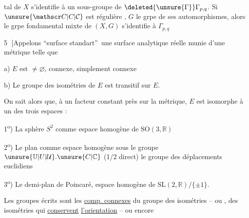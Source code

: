 %
tal de $X$ s'identifie à un sous-groupe de $\deleted{\unsure{\Gamma}}\Gamma_{p,q}$. Si $\unsure{\mathscr C|C|\mathcal C}$ est régulière , $G$ le grpe de ses automorphismes, alors le grpe fondamental mixte de $(X,G)$ s'identifie à $\Gamma_{p,q}$

\textcircled{5} [Appelons  \textquotedblleft surface  standart\textquotedblright\ une surface   analytique réelle munie d'une métrique  telle que

a) $E$ est $\ne\varnothing$, connexe, simplement connexe

b) Le groupe des isométries de $E$ est transitif sur $E$.

 On sait alors que, à un facteur constant près sur la métrique, $E$ est isomorphe à un des trois espaces :

1\textsuperscript{o}) La sphère $S^2$ comme espace homogène de $\mathrm{SO}(3,\mathbb R)$

2\textsuperscript{o}) Le plan    comme espace homogène sous le groupe $\unsure{\mathbb U|U|\mathcal U}.\unsure{C|\mathbb C}$ (1/2 direct) le groupe des déplacements euclidiens

3\textsuperscript{o}) Le demi-plan de Poincaré,  espace homogène de $\mathrm{SL}(2,\mathbb R)/\{\pm1\}$.

Les groupes écrits sont les \uline{comp. connexes} du groupe des isométries -- ou ,  des isométries qui \uline{conservent} \uline{l'orientation} -- ou encore 

